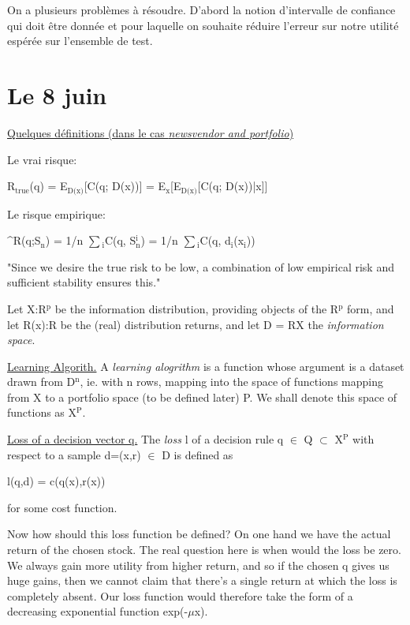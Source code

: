 \documentclass[11pt]{article}
\begin{document}
On a plusieurs problèmes à résoudre. D'abord la notion d'intervalle de confiance qui doit
être donnée et pour laquelle on souhaite réduire l'erreur sur notre utilité espérée sur
l'ensemble de test. 


\section{\textbf{Le 8 juin}}
\label{sec-8}

\uline{Quelques définitions (dans le cas \emph{newsvendor and portfolio})}

Le vrai risque:

R$_{\text{true}}$(q) = E$_{\text{D(x)}}$[C(q; D(x))]
        = E$_{\text{x}}$[E$_{\text{D(x)}}$[C(q; D(x))|x]]

Le risque empirique:

\^{}R(q;S$_{\text{n}}$) = 1/n $\sum$$_{\text{i}}$C(q, S$_{\text{n}}^{\text{i}}$)
         = 1/n $\sum$$_{\text{i}}$C(q, d$_{\text{i}}$(x$_{\text{i}}$))

"Since we desire the true risk to be low, a combination of low empirical risk and
sufficient stability ensures this."


Let X:R$^{\text{p}}$ be the information distribution, providing objects of the R$^{\text{p}}$ form, and let R(x):R
be the (real) distribution returns, and let D = R\texttimes{}X the \emph{information space}. 

\uline{Learning Algorith.}
A \emph{learning alogrithm} is a function whose argument is a dataset drawn from D$^{\text{n}}$, ie. with n
rows, mapping into the space of functions mapping from X to a portfolio space (to be
defined later) P. We shall denote this space of functions as X$^{\text{P}}$.

\uline{Loss of a decision vector q.}
The \emph{loss} l of a decision rule q $\in$ Q $\subset$ X$^{\text{P}}$ with respect to a sample d=(x,r) $\in$ D is defined as

l(q,d) = c(q(x),r(x))

for some cost function. 


Now how should this loss function be defined? On one hand we have the actual return of the
chosen stock. The real question here is when would the loss be zero. We always gain more
utility from higher return, and so if the chosen q gives us huge gains, then we cannot
claim that there's a single return at which the loss is completely absent. Our loss
function would therefore take the form of a decreasing exponential function exp(-$\mu$x).
\end{document}
